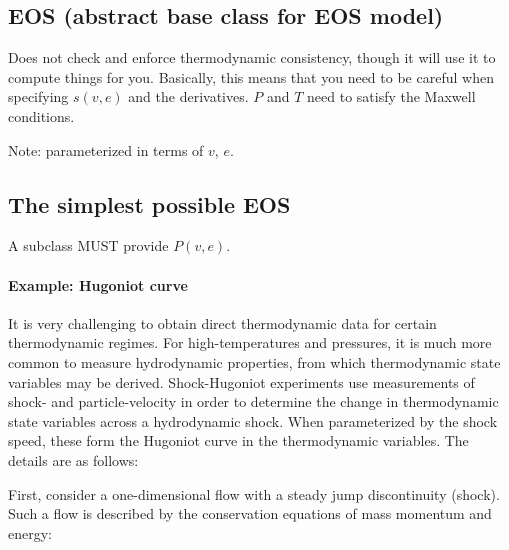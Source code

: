 \documentclass[twocolumn,10pt]{asme2ej}
\begin{document}
\subsection{EOS (abstract base class for EOS model)}
Does not check and enforce thermodynamic consistency, though it will use it to compute things for you. Basically, this means that you need to be careful when specifying $s\left(v,e\right)$ and the  derivatives. $P$ and $T$ need to satisfy the Maxwell conditions.

Note: parameterized in terms of $v$, $e$. 

\subsection{The simplest possible EOS}
A subclass MUST provide $P\left(v,e\right)$.

\paragraph{Example: Hugoniot curve}
It is very challenging to obtain direct thermodynamic data for certain thermodynamic regimes. For high-temperatures and pressures, it is much more common to measure hydrodynamic properties, from which thermodynamic state variables may be derived. Shock-Hugoniot experiments use measurements of shock- and particle-velocity in order to determine the change in thermodynamic state variables across a hydrodynamic shock. When parameterized by the shock speed, these form the Hugoniot curve in the thermodynamic variables. The details are as follows:

First, consider a one-dimensional flow with a steady jump discontinuity (shock). Such a flow is described by the conservation equations of mass momentum and energy\cite{RN818}:
\end{document}
